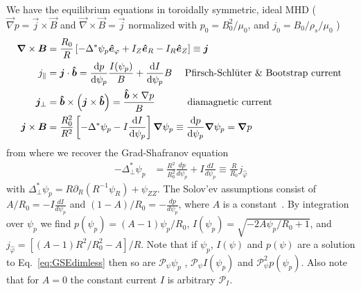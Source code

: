 We have the equilibrium equations in toroidally symmetric, ideal MHD (
$\vec\nabla p = \vec j\times \vec B$ and $\vec \nabla\times\vec B = \vec j$ normalized with $p_0 = B_0^2/\mu_0$, and $j_0 = B_0/\rho_s/\mu_0$ )
\begin{align}
    {\boldsymbol{\nabla}}\times {\boldsymbol{B}} &= \frac{R_0}{R}\left[ -\Delta^*\psi_p\bm{\hat{e}}_\varphi + I_Z \bm{\hat{e}}_R - I_R\bm{\hat{e}}_Z \right]\equiv {\boldsymbol{j}}\\
 j_\parallel &= {\boldsymbol{j}}\cdot \bm{\hat{b}} = \frac{\mathrm{d} p}{\mathrm{d}\psi_p} \frac{I(\psi_p)}{B} +
 \frac{\mathrm{d} I}{\mathrm{d}\psi_p} B \quad \text{  Pfirsch-Schl\"uter \& Bootstrap current } \\
 {\boldsymbol{j}}_\perp &= \bm{\hat{b}}\times\left({\boldsymbol{j}}\times\bm{\hat{b}}\right)=
 \frac{\bm{\hat{b}} \times \nabla p}{B} \quad\quad\quad \text{ diamagnetic current} \\
 {\boldsymbol{j}}\times{\boldsymbol{B}} &= \frac{R_0^2}{R^2}\left[ -\Delta^* \psi_p - I
     \frac{\mathrm{d} I}{\mathrm{d} \psi_p} \right]{\boldsymbol{\nabla}}\psi_p \equiv \frac{\mathrm{d} p}{\mathrm{d}\psi_p}{\boldsymbol{\nabla}}\psi_p ={\boldsymbol{\nabla}} p
\end{align}
from where we recover the Grad-Shafranov equation
\begin{align}\label{eq:GSEdimless}
    -\Delta^*_\perp  \psi_p &= \frac{R^2}{R_0^2} \frac{d p}{d  \psi_p } + I \frac{d I}{d  \psi_p } \equiv \frac{R}{R_0} j_{\hat\varphi}
\end{align}
with $\Delta^*_\perp \psi_p = R\partial_R (R^{-1}\psi_R) + \psi_{ZZ}$.
The Solov'ev assumptions consist of \(A/R_0 = -I \frac{d I}{d  \psi_p }\) and \((1-A)/R_0 = -\frac{d p}{d  \psi_p }\), where \(A\) is a constant~\cite{Cerfon2010,Cerfon2014}.
By integration over \(\psi_p\) we find
$
 p(\psi_p) = (A-1)\psi_p/R_0$,
 $I(\psi_p) = \sqrt{-2 A \psi_p/R_0 + 1}$,
 and
    $j_{\hat\varphi} = \left[(A-1)R^2/R_0^2 - A \right]/R $.
Note that if $\psi_p$, $I(\psi)$ and $p(\psi)$ are a solution to Eq.~\eqref{eq:GSEdimless}
then so are $\mathcal P_\psi \psi_p$ , $\mathcal P_\psi I(\psi_p)$ and $\mathcal P_\psi^2 p(\psi_p)$.
Also note that for $A=0$ the constant current $I$ is arbitrary $\mathcal P_I$.

